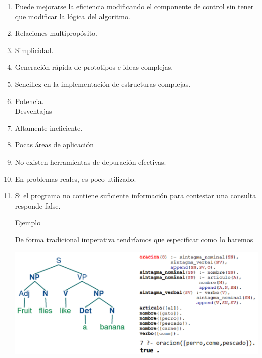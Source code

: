 \begin{enumerate}[1.]
\item Puede mejorarse la eficiencia modificando el componente de control sin tener que modificar la lógica del algoritmo.
\item Relaciones multipropósito.
\item Simplicidad.
\item Generación rápida de prototipos e ideas complejas.
\item Sencillez en la implementación de estructuras complejas.
\item Potencia.
\\
Desventajas
\\
\item Altamente ineficiente.
\item Pocas áreas de aplicación
\item No existen herramientas de depuración efectivas.
\item En problemas reales, es poco utilizado.
\item Si el programa no contiene suficiente información para contestar una consulta responde false.
	

	
Ejemplo

De forma tradicional imperativa tendríamos que especificar como lo haremos

\begin{center}
\includegraphics[scale=0.50]{./Imagenes/img08.png} 
\end{center}


\end{enumerate}
